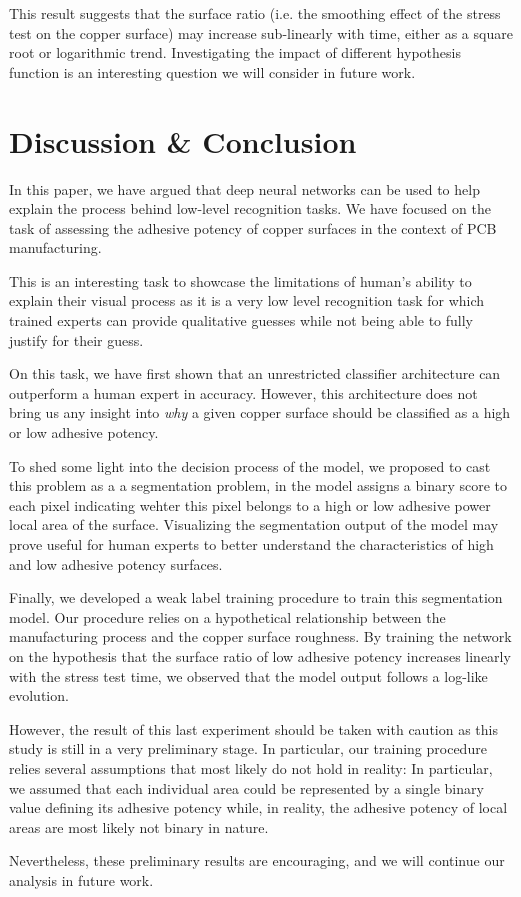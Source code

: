 \documentclass[10pt,twocolumn,letterpaper]{article}
\begin{document}
This result suggests that the surface ratio (i.e. the smoothing effect of the stress test on the copper surface) may increase sub-linearly with time, either as a square root or logarithmic trend.
Investigating the impact of different hypothesis function is an 
interesting question we will consider in future work.

\section{Discussion \& Conclusion}

In this paper, we have argued that deep neural networks can be used to 
help explain the process behind low-level recognition tasks.
We have focused on the task of assessing the adhesive potency 
of copper surfaces in the context of PCB manufacturing.

This is an interesting task to showcase the limitations of human's ability to explain their visual process
as it is a very low level recognition task for which trained experts can provide qualitative guesses while
not being able to fully justify for their guess.

On this task, we have first shown that an unrestricted classifier 
architecture can outperform a human expert in accuracy.
However, this architecture does not bring us any insight 
into \textit{why} a given copper surface should be classified 
as a high or low adhesive potency.

To shed some light into the decision process of the model,
we proposed to cast this problem as a a segmentation problem, 
in the model assigns a binary score to each pixel indicating wehter this
pixel belongs to a high or low adhesive power local area of the surface.
Visualizing the segmentation output of the model may prove useful for 
human experts to better understand the characteristics of high and low 
adhesive potency surfaces.

Finally, we developed a weak label training procedure to train this segmentation model.
Our procedure relies on a hypothetical relationship between the manufacturing process and the
copper surface roughness.
By training the network on the hypothesis that the surface ratio of low adhesive potency increases
linearly with the stress test time, we observed that the model output follows a log-like evolution.

However, the result of this last experiment should be taken with caution as this study is still in a very preliminary stage.
In particular, our training procedure relies several assumptions that most likely do not hold in reality: 
In particular, we assumed that each individual area could be represented by a single binary value defining its adhesive potency
while, in reality, the adhesive potency of local areas are most likely not binary in nature.

Nevertheless, these preliminary results are encouraging, and we will continue our analysis in future work.

{\small
	
	
}
\end{document}
